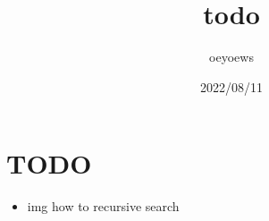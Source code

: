 \documentclass[UTF8]{ctexart}
\title{todo}
\author{oeyoews}
\date{2022/08/11}
\begin{document}
\maketitle

\section{TODO}%
\label{sec:TODO}

\begin{itemize}
  \item img how to recursive search
\end{itemize}
\end{document}
